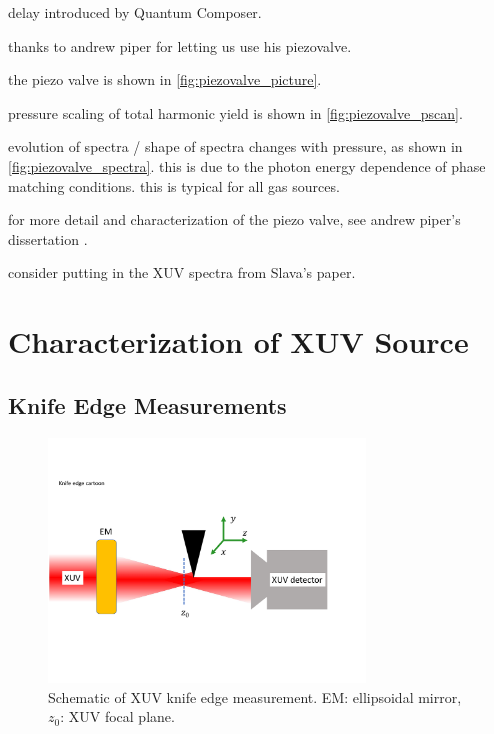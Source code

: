 delay introduced by Quantum Composer.

thanks to andrew piper for letting us use his piezovalve.

the piezo valve is shown in \cref{fig:piezovalve_picture}.

pressure scaling of total harmonic yield is shown in \cref{fig:piezovalve_pscan}.

evolution of spectra / shape of spectra changes with pressure, as shown in \cref{fig:piezovalve_spectra}. this is due to the photon energy dependence of phase matching conditions. this is typical for all gas sources.

for more detail and characterization of the piezo valve, see andrew piper's dissertation \cite{piperAndrewPiperDissertation2022}.

consider putting in the XUV spectra from Slava's paper.

\section{Characterization of XUV Source}

\subsection{Knife Edge Measurements}

\begin{figure}
	\centering
	\includegraphics[width=0.75\textwidth]{figures/chap3/knife_edge_cartoon.pdf}
	\caption{Schematic of XUV knife edge measurement. EM: ellipsoidal mirror, $z_0$: XUV focal plane.}
	\label{fig:knife_edge_cartoon}
\end{figure}

